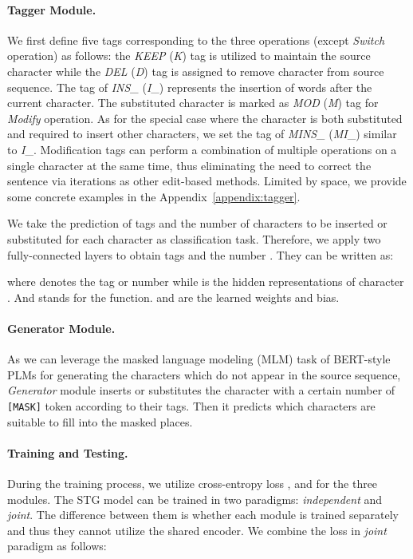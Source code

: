\documentclass[11pt]{article}
\begin{document}
\paragraph{Tagger Module.} We first define five tags corresponding to the three operations (except \emph{Switch} operation) as follows: the \emph{KEEP} (\emph{K}) tag is utilized to maintain the source character while the \emph{DEL} (\emph{D}) tag is assigned to remove character from source sequence. The tag of \emph{INS\_} (\emph{I}\_) represents the insertion of  words after the current character. The substituted character is marked as \emph{MOD} (\emph{M}) tag for \emph{Modify} operation. As for the special case where the character is both substituted and required to insert other characters, we set the tag of \emph{MINS\_} (\emph{MI}\_) similar to \emph{I}\_. Modification tags can perform a combination of multiple operations on a single character at the same time, thus eliminating the need to correct the sentence via iterations as other edit-based methods. Limited by space, we provide some concrete examples in the Appendix~\ref{appendix:tagger}.

We take the prediction of tags and the number  of characters to be inserted or substituted for each character as classification task. Therefore, we apply two fully-connected layers to obtain tags and the number . They can be written as:

where  denotes the tag or number  while  is the hidden representations of character . And  stands for the  function.  and  are the learned weights and bias.


\paragraph{Generator Module.} As we can leverage the masked language modeling (MLM) task \cite{devlin2018bert} of BERT-style PLMs for generating the characters which do not appear in the source sequence, \emph{Generator} module inserts or substitutes the character with a certain number  of \texttt{[MASK]} token according to their tags. Then it predicts which characters are suitable to fill into the masked places.

\paragraph{Training and Testing.} During the training process, we utilize cross-entropy loss ,  and  for the three modules. The STG model can be trained in two paradigms: \emph{independent} and \emph{joint}. The difference between them is whether each module is trained separately and thus they cannot utilize the shared encoder. We combine the loss in \emph{joint} paradigm as follows:
\end{document}
